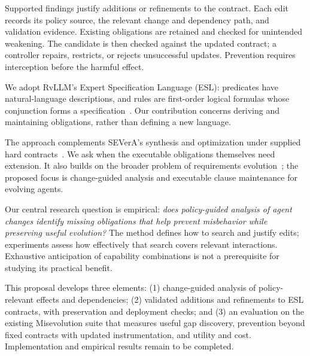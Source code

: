 Supported findings justify additions or refinements to the contract. Each edit records its policy source, the relevant change and dependency path, and validation evidence. Existing obligations are retained and checked for unintended weakening. The candidate is then checked against the updated contract; a controller repairs, restricts, or rejects unsuccessful updates. Prevention requires interception before the harmful effect.

We adopt RvLLM's Expert Specification Language (ESL): predicates have natural-language descriptions, and rules are first-order logical formulas whose conjunction forms a specification~\cite{zhang2025rvllm}. Our contribution concerns deriving and maintaining obligations, rather than defining a new language.

The approach complements SEVerA's synthesis and optimization under supplied hard contracts~\cite{banerjee2026severa}. We ask when the executable obligations themselves need extension. It also builds on the broader problem of requirements evolution~\cite{ali2011requirements}; the proposed focus is change-guided analysis and executable clause maintenance for evolving agents.

Our central research question is empirical: \emph{does policy-guided analysis of agent changes identify missing obligations that help prevent misbehavior while preserving useful evolution?} The method defines how to search and justify edits; experiments assess how effectively that search covers relevant interactions. Exhaustive anticipation of capability combinations is not a prerequisite for studying its practical benefit.

This proposal develops three elements: (1) change-guided analysis of policy-relevant effects and dependencies; (2) validated additions and refinements to ESL contracts, with preservation and deployment checks; and (3) an evaluation on the existing Misevolution suite that measures useful gap discovery, prevention beyond fixed contracts with updated instrumentation, and utility and cost. Implementation and empirical results remain to be completed.
